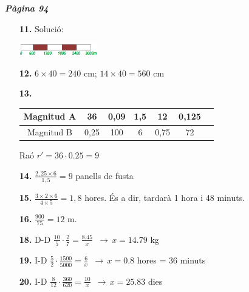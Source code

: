 \documentclass[a4paper, pdf, twoside]{book}
\begin{document}
\begin{multicols}{2}
{\textbf{\em Pàgina 94}} \hrulefill
\begin{enumerate}
\vspace{0.25cm}
\item[\fontfamily{phv}\selectfont\color{blue}\textbf{11. }] 
Solució:\par \includegraphics [width=3.4cm]{img-sol/t7-11}
 \end{enumerate}
\begin{enumerate}
\vspace{0.25cm}
\item[\fontfamily{phv}\selectfont\color{blue}\textbf{12. }] 
$6\times 40 = 240$ cm; $14\times 40= 560$ cm
\vspace{0.25cm}
\item[\fontfamily{phv}\selectfont\color{blue}\textbf{13. }] 
\begin {tabular}{|c|c|c|c|c|c|c|}\hline Magnitud A & 36 & 0,09 & 1,5& 12 & 0,125\tabularnewline \hline Magnitud B & 0,25 & 100 & 6 & 0,75 & 72\tabularnewline \hline \end {tabular}\par Raó $r'=36\cdot 0.25 = 9$ 
\vspace{0.25cm}
\item[\fontfamily{phv}\selectfont\color{blue}\textbf{14. }] 
$\frac {2,25\times 6}{1,5}=9$ panells de fusta
\vspace{0.25cm}
\item[\fontfamily{phv}\selectfont\color{blue}\textbf{15. }] 
$\frac {3\times 2 \times 6}{4 \times 5}=1,8$ hores. És a dir, tardarà 1 hora i 48 minuts.
\vspace{0.25cm}
\item[\fontfamily{phv}\selectfont\color{blue}\textbf{16. }] 
$\frac {900}{75}=12$ m.
\vspace{0.25cm}
\item[\fontfamily{phv}\selectfont\color{blue}\textbf{18. }] 
D-D $\frac {10}{5} \cdot \frac {2}{7} = \frac {8.45}{x}$ $\, \rightarrow \, x=14.79$ kg
\vspace{0.25cm}
\item[\fontfamily{phv}\selectfont\color{blue}\textbf{19. }] 
I-D $\frac {5}{2} \cdot \frac {1500}{5000} = \frac {6}{x}$ $\, \rightarrow \, x=0.8$ hores = 36 minuts
\vspace{0.25cm}
\item[\fontfamily{phv}\selectfont\color{blue}\textbf{20. }] 
I-D $\frac {8}{12} \cdot \frac {360}{620} = \frac {10}{x}$ $\, \rightarrow \, x=25.83$ dies
 \end{enumerate}
\vspace{0.3cm}


\end{multicols}
\end{document}
